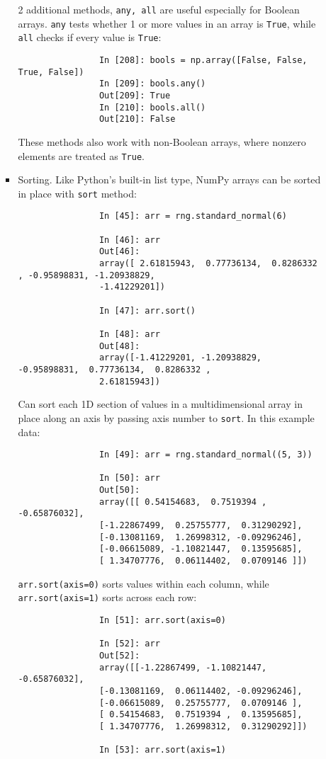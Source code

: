 \documentclass{article}
\begin{document}
\begin{itemize}
\begin{itemize}
\begin{itemize}
			2 additional methods, \fbox{$\forall,\exists$} {\tt any, all} are useful especially for Boolean arrays. {\tt any} tests whether 1 or more values in an array is {\tt True}, while {\tt all} checks if every value is {\tt True}:
			\begin{verbatim}
				In [208]: bools = np.array([False, False, True, False])
				In [209]: bools.any()
				Out[209]: True
				In [210]: bools.all()
				Out[210]: False
			\end{verbatim}
			These methods also work with non-Boolean arrays, where nonzero elements are treated as {\tt True}.
			\item {\sf Sorting.} Like Python's built-in list type, NumPy arrays can be sorted in place with {\tt sort} method:
			\begin{verbatim}
				In [45]: arr = rng.standard_normal(6)
				
				In [46]: arr
				Out[46]: 
				array([ 2.61815943,  0.77736134,  0.8286332 , -0.95898831, -1.20938829,
				-1.41229201])
				
				In [47]: arr.sort()
				
				In [48]: arr
				Out[48]: 
				array([-1.41229201, -1.20938829, -0.95898831,  0.77736134,  0.8286332 ,
				2.61815943])
			\end{verbatim}
			Can sort each 1D section of values in a multidimensional array in place along an axis by passing axis number to {\tt sort}. In this example data:
			\begin{verbatim}
				In [49]: arr = rng.standard_normal((5, 3))
				
				In [50]: arr
				Out[50]: 
				array([[ 0.54154683,  0.7519394 , -0.65876032],
				[-1.22867499,  0.25755777,  0.31290292],
				[-0.13081169,  1.26998312, -0.09296246],
				[-0.06615089, -1.10821447,  0.13595685],
				[ 1.34707776,  0.06114402,  0.0709146 ]])
			\end{verbatim}
			{\tt arr.sort(axis=0)} sorts values within each column, while {\tt arr.sort(axis=1)} sorts across each row:
			\begin{verbatim}
				In [51]: arr.sort(axis=0)
				
				In [52]: arr
				Out[52]: 
				array([[-1.22867499, -1.10821447, -0.65876032],
				[-0.13081169,  0.06114402, -0.09296246],
				[-0.06615089,  0.25755777,  0.0709146 ],
				[ 0.54154683,  0.7519394 ,  0.13595685],
				[ 1.34707776,  1.26998312,  0.31290292]])
				
				In [53]: arr.sort(axis=1)
				

\end{verbatim}
\end{itemize}
\end{itemize}
\end{itemize}
\end{document}
